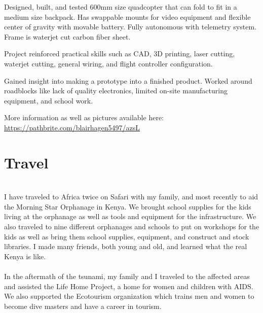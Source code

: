 \documentclass[]{deedy-resume-openfont}
\begin{document}

\begin{tightemize}
\item Designed, built, and tested 600mm size quadcopter that can fold to fit in a medium size backpack. Has swappable mounts for video equipment and flexible center of gravity with movable battery. Fully autonomous with telemetry system. Frame is waterjet cut carbon fiber sheet.
\item Project reinforced practical skills such as CAD, 3D printing, laser cutting, waterjet cutting, general wiring, and flight controller configuration.
\item Gained insight into making a prototype into a finished product. Worked around roadblocks like lack of quality electronics, limited on-site manufacturing equipment, and school work.
\item More information as well as pictures available here: 
\underline{\url{https://pathbrite.com/blairhagen5497/azsL}}
\end{tightemize}
\sectionsep


\section{Travel} 
 \\
\normalsize I have traveled to Africa twice on Safari with my family, and most recently to aid the Morning Star Orphanage in Kenya. We brought school supplies for the kids living at the orphanage as well as tools and equipment for the infrastructure. We also traveled to nine different orphanages and schools to put on workshops for the kids as well as bring them school supplies, equipment, and construct and stock libraries. I made many friends, both young and old, and learned what the real Kenya is like. \\
 \\
\normalsize In the aftermath of the tsunami, my family and I traveled to the affected areas and assisted the Life Home Project, a home for women and children with AIDS. We also supported the Ecotourism organization which trains men and women to become dive masters and have a career in tourism.
\end{document}
